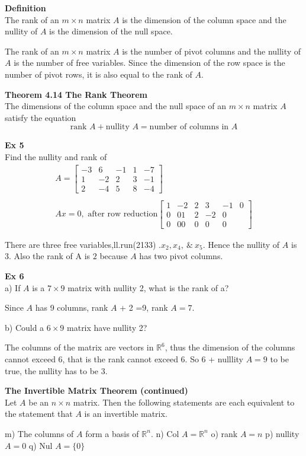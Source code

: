 \documentclass{article}
\begin{document}
  \textbf{Definition}\\
  The rank of an $ m \times n $ matrix $ A $ is the dimension of the column space and the nullity of $ A $ is the dimension of the null space.
  
  The rank of an $ m \times n $ matrix $ A $ is the number of pivot columns and the nullity of $ A $ is the number of free variables. Since the dimension of the row space is the number of pivot rows, it is also equal to the rank of $ A $.

  \textbf{Theorem 4.14 The Rank Theorem}\\
  The dimensions of the column space and the null space of an $ m \times n $ matrix $ A $ satisfy the equation
  \[
    \text{rank }A+ \text{nullity }A= \text{number of columns in }A
  \]

  \textbf{Ex 5}\\
  Find the nullity and rank of
  \[
    \begin{gathered}
    A = \begin{bmatrix}
      -3 &6 &-1 &1 &-7\\
      1 &-2 &2 &3 &-1\\
      2 &-4 &5 &8 &-4
    \end{bmatrix}\\
    ~\\
    Ax=0, \text{ after row reduction}
    \begin{bmatrix}
      1 &-2 &2 &3 &-1 &0\\
      0 &0 1 &2 &-2 &0\\
      0 &0 0 &0 &0 &0
    \end{bmatrix}
    \end{gathered}
  \]

  There are three free variables,ll.run(2133)
  .$ x_2,x_4, ~\&~ x_5 $. Hence the nullity of $ A $ is 3. Also the rank of A is $ 2 $ because $ A $ has two pivot columns.

  \textbf{Ex 6}\\
  a) If $ A $ is a $  7 \times 9 $ matrix with nullity 2, what is the rank of a?

  Since $ A $ has 9 columns, rank $ A $ + 2 =9, rank $ A =7$.

  b) Could a $ 6 \times 9 $ matrix have nullity 2?

  The columns of the matrix are vectors in $ \mathbb{R}^{6} $, thus the dimension of the columns cannot exceed 6, that is the rank cannot exceed 6. So 6 + nulllity $ A =9$ to be true, the nullity has to be $ 3 $.

  \textbf{The Invertible Matrix Theorem (continued)}\\
  Let $ A $ be an $ n \times n $ matrix. Then the following statements are each equivalent to the statement that $ A $ is an invertible matrix.

  m) The columns of $ A $ form a basis of $ \mathbb{R}^{n} $.
  n) Col $ A =\mathbb{R}^{n}$
  o) rank $ A=n $
  p) nullity $ A =0$
  q) Nul $ A =\{ 0 \}$ 
  
\end{document}
